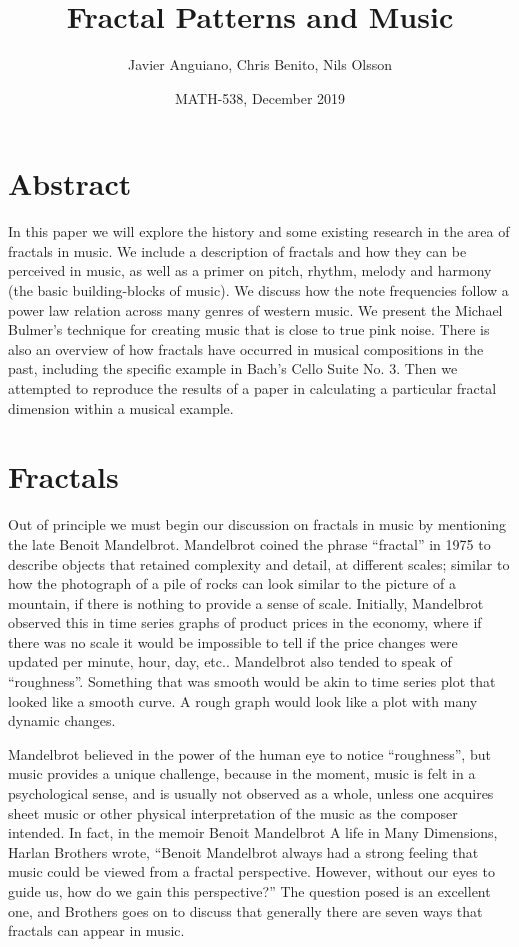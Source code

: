 \documentclass{article}
\title{Fractal Patterns and Music}
\date{MATH-538, December 2019}
\author{Javier Anguiano, Chris Benito, Nils Olsson}
\begin{document}
\maketitle

\section{Abstract}

In this paper we will explore the history and some existing research in the area
of fractals in music. We include a description of fractals and how they can be
perceived in music, as well as a primer on pitch, rhythm, melody and harmony
(the basic building-blocks of music). We discuss how the note frequencies follow
a power law relation across many genres of western music. We present the Michael
Bulmer’s technique for creating music that is close to true pink noise. There is
also an overview of how fractals have occurred in musical compositions in the
past, including the specific example in Bach’s Cello Suite No. 3. Then we
attempted to reproduce the results of a paper in calculating a particular
fractal dimension within a musical example.

\begin{center}
    \hrulefill{}
\end{center}

\section{Fractals}

Out of principle we must begin our discussion on fractals in music by mentioning
the late Benoit Mandelbrot. Mandelbrot coined the phrase “fractal” in 1975 to
describe objects that retained complexity and detail, at different scales;
similar to how the photograph of a pile of rocks can look similar to the picture
of a mountain, if there is nothing to provide a sense of scale\cite{3}. Initially,
Mandelbrot observed this in time series graphs of product prices in the economy,
where if there was no scale it would be impossible to tell if the price changes
were updated per minute, hour, day, etc.\cite{3}. Mandelbrot also tended to speak of
“roughness”\cite{4}. Something that was smooth would be akin to time series plot that
looked like a smooth curve. A rough graph would look like a plot with many
dynamic changes.

Mandelbrot believed in the power of the human eye to notice
“roughness”\cite{3,4}, but music provides a unique challenge, because in the
moment, music is felt in a psychological sense, and is usually not observed as a
whole, unless one acquires sheet music or other physical interpretation of the
music as the composer intended. In fact, in the memoir Benoit Mandelbrot A life
in Many Dimensions, Harlan Brothers wrote, “Benoit Mandelbrot always had a
strong feeling that music could be viewed from a fractal perspective. However,
without our eyes to guide us, how do we gain this perspective?”\cite{13} The
question posed is an excellent one, and Brothers goes on to discuss that
generally there are seven ways that fractals can appear in music.
\end{document}
